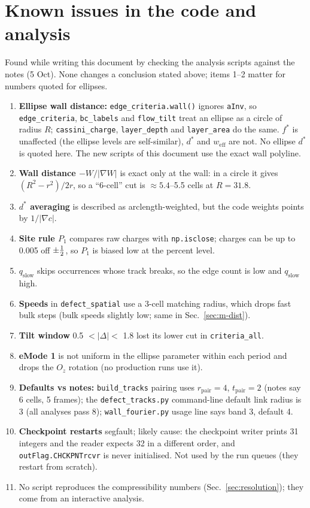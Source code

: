 \section{Known issues in the code and analysis}\label{app:issues}
Found while writing this document by checking the analysis scripts against the notes (5 Oct). None changes a conclusion stated above;
items 1--2 matter for numbers quoted for ellipses.
\begin{enumerate}
  \item \textbf{Ellipse wall distance:} \texttt{edge\_criteria.wall()} ignores \texttt{aInv}, so \texttt{edge\_criteria}, \texttt{bc\_labels}
        and \texttt{flow\_tilt} treat an ellipse as a circle of radius $R$; \texttt{cassini\_charge}, \texttt{layer\_depth} and
        \texttt{layer\_area} do the same. $f^*$ is unaffected (the ellipse levels are self-similar), $d^*$ and $w_\mathrm{eff}$ are not. No
        ellipse $d^*$ is quoted here. The new scripts of this document use the exact wall polyline.
  \item \textbf{Wall distance $-W/|\nabla W|$} is exact only at the wall: in a circle it gives $(R^2-r^2)/2r$, so a ``6-cell'' cut is
        $\approx5.4$--5.5 cells at $R=31.8$.
  \item \textbf{$d^*$ averaging} is described as arclength-weighted, but the code weights points by $1/|\nabla c|$.
  \item \textbf{Site rule $P_1$} compares raw charges with \texttt{np.isclose}; charges can be up to 0.005 off $\pm\tfrac12$, so $P_1$ is biased
        low at the percent level.
  \item \textbf{$q_\mathrm{slow}$} skips occurrences whose track breaks, so the edge count is low and $q_\mathrm{slow}$ high.
  \item \textbf{Speeds} in \texttt{defect\_spatial} use a 3-cell matching radius, which drops fast bulk steps (bulk speeds slightly low;
        same in Sec.~\ref{sec:m-dist}).
  \item \textbf{Tilt window} 0.5 $<|\Delta|<$ 1.8 lost its lower cut in \texttt{criteria\_all}.
  \item \textbf{eMode 1} is not uniform in the ellipse parameter within each period and drops the $O_z$ rotation (no production runs use it).
  \item \textbf{Defaults vs notes:} \texttt{build\_tracks} pairing uses $r_\mathrm{pair}=4$, $t_\mathrm{pair}=2$ (notes say 6 cells, 5 frames);
        the \texttt{defect\_tracks.py} command-line default link radius is 3 (all analyses pass 8); \texttt{wall\_fourier.py} usage line says
        band 3, default 4.
  \item \textbf{Checkpoint restarts} segfault; likely cause: the checkpoint writer prints 31 integers and the reader expects 32 in a
        different order, and \texttt{outFlag.CHCKPNTrcvr} is never initialised. Not used by the run queues (they restart from scratch).
  \item No script reproduces the compressibility numbers (Sec.~\ref{sec:resolution}); they come from an interactive analysis.
\end{enumerate}
